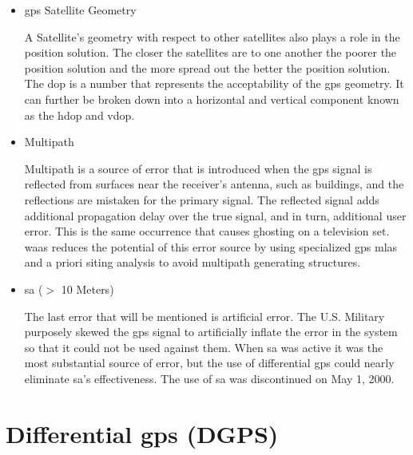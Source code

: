 \begin{itemize}
 	\item \ac{gps} Satellite Geometry

A Satellite's geometry with respect to other satellites also plays a role in the position solution.  The closer the satellites are to one another the poorer the position solution and the more spread out the better the position solution.  The \ac{dop} is a number that represents the acceptability of the \ac{gps} geometry.  It can further be broken down into a horizontal and vertical component known as the \ac{hdop} and \ac{vdop}.

	\item Multipath

Multipath is a source of error that is introduced when the \ac{gps} signal is reflected from surfaces near the receiver's antenna, such as buildings, and the
reflections are mistaken for the primary signal. The reflected signal
adds additional propagation delay over the true signal, and in turn,
additional user error. This is the same occurrence that causes ghosting on a television set. \ac{waas} reduces the potential of this error source by using specialized \ac{gps} \acp{mla} and a priori siting analysis to avoid multipath generating structures.

	\item \ac{sa} ($>$ 10 Meters)

The last error that will be mentioned is artificial error.  The U.S. Military purposely skewed the \ac{gps} signal to artificially inflate the error in the system so that it could not be used against them.  When \ac{sa} was active it was the most substantial source of error, but the use of differential \ac{gps} could nearly eliminate \ac{sa}'s effectiveness. The use of \ac{sa} was discontinued on May 1, 2000.

\end{itemize}

\section{Differential \ac{gps} (DGPS)\label{section:DGPS}}

